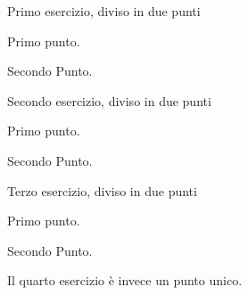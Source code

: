 \documentclass[italian, a4paper]{article}
\begin{document}
\begin{Ex}
Primo esercizio, diviso in due punti
\begin{lett}
\item Primo punto.
\item Secondo Punto.
\end{lett}
\end{Ex}

\begin{Ex}
Secondo esercizio, diviso in due punti
\begin{lett}
\item Primo punto.
\item Secondo Punto.
\end{lett}
\end{Ex}

\begin{Ex}
Terzo esercizio, diviso in due punti
\begin{lett}
\item Primo punto.
\item Secondo Punto.
\end{lett}
\end{Ex}

\begin{Ex}
Il quarto esercizio è invece un punto unico.
\end{Ex}

\end{document}
